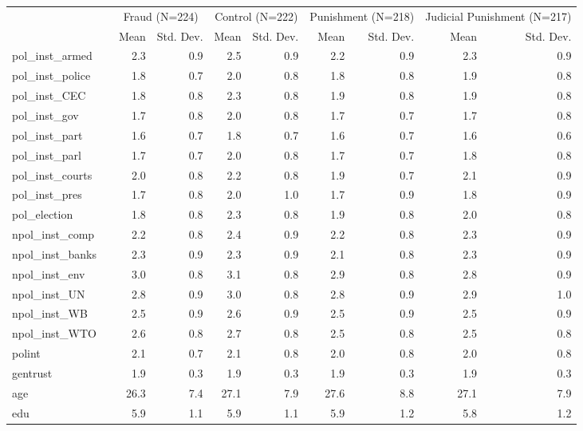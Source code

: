 \begin{table}
\centering
\begin{tabular}[t]{llrrrrrrrr}
\toprule
\multicolumn{2}{c}{ } & \multicolumn{2}{c}{Fraud (N=224)} & \multicolumn{2}{c}{Control (N=222)} & \multicolumn{2}{c}{Punishment (N=218)} & \multicolumn{2}{c}{Judicial Punishment (N=217)} \\
\cmidrule(l{3pt}r{3pt}){3-4} \cmidrule(l{3pt}r{3pt}){5-6} \cmidrule(l{3pt}r{3pt}){7-8} \cmidrule(l{3pt}r{3pt}){9-10}
  &    & Mean & Std. Dev. & Mean & Std. Dev. & Mean & Std. Dev. & Mean & Std. Dev.\\
\midrule
pol\_inst\_armed &  & 2.3 & 0.9 & 2.5 & 0.9 & 2.2 & 0.9 & 2.3 & 0.9\\
pol\_inst\_police &  & 1.8 & 0.7 & 2.0 & 0.8 & 1.8 & 0.8 & 1.9 & 0.8\\
pol\_inst\_CEC &  & 1.8 & 0.8 & 2.3 & 0.8 & 1.9 & 0.8 & 1.9 & 0.8\\
pol\_inst\_gov &  & 1.7 & 0.8 & 2.0 & 0.8 & 1.7 & 0.7 & 1.7 & 0.8\\
pol\_inst\_part &  & 1.6 & 0.7 & 1.8 & 0.7 & 1.6 & 0.7 & 1.6 & 0.6\\
pol\_inst\_parl &  & 1.7 & 0.7 & 2.0 & 0.8 & 1.7 & 0.7 & 1.8 & 0.8\\
pol\_inst\_courts &  & 2.0 & 0.8 & 2.2 & 0.8 & 1.9 & 0.7 & 2.1 & 0.9\\
pol\_inst\_pres &  & 1.7 & 0.8 & 2.0 & 1.0 & 1.7 & 0.9 & 1.8 & 0.9\\
pol\_election &  & 1.8 & 0.8 & 2.3 & 0.8 & 1.9 & 0.8 & 2.0 & 0.8\\
npol\_inst\_comp &  & 2.2 & 0.8 & 2.4 & 0.9 & 2.2 & 0.8 & 2.3 & 0.9\\
npol\_inst\_banks &  & 2.3 & 0.9 & 2.3 & 0.9 & 2.1 & 0.8 & 2.3 & 0.9\\
npol\_inst\_env &  & 3.0 & 0.8 & 3.1 & 0.8 & 2.9 & 0.8 & 2.8 & 0.9\\
npol\_inst\_UN &  & 2.8 & 0.9 & 3.0 & 0.8 & 2.8 & 0.9 & 2.9 & 1.0\\
npol\_inst\_WB &  & 2.5 & 0.9 & 2.6 & 0.9 & 2.5 & 0.9 & 2.5 & 0.9\\
npol\_inst\_WTO &  & 2.6 & 0.8 & 2.7 & 0.8 & 2.5 & 0.8 & 2.5 & 0.8\\
polint &  & 2.1 & 0.7 & 2.1 & 0.8 & 2.0 & 0.8 & 2.0 & 0.8\\
gentrust &  & 1.9 & 0.3 & 1.9 & 0.3 & 1.9 & 0.3 & 1.9 & 0.3\\
age &  & 26.3 & 7.4 & 27.1 & 7.9 & 27.6 & 8.8 & 27.1 & 7.9\\
edu &  & 5.9 & 1.1 & 5.9 & 1.1 & 5.9 & 1.2 & 5.8 & 1.2\\

\end{tabular}
\end{table}
